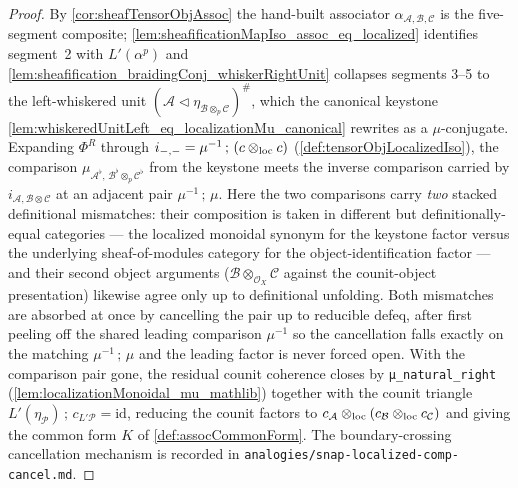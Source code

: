 \begin{proof}
  By \cref{cor:sheafTensorObjAssoc} the hand-built associator
  \(\alpha_{\mathcal{A},\mathcal{B},\mathcal{C}}\) is the five-segment composite;
  \cref{lem:sheafificationMapIso_assoc_eq_localized} identifies segment~2 with
  \(L'(\alpha^p)\) and
  \cref{lem:sheafification_braidingConj_whiskerRightUnit} collapses segments 3--5 to
  the left-whiskered unit \((\mathcal{A} \lhd \eta_{\mathcal{B}\otimes_p\mathcal{C}})^{\#}\),
  which the canonical keystone
  \cref{lem:whiskeredUnitLeft_eq_localizationMu_canonical} rewrites as a
  \(\mu\)-conjugate. Expanding \(\Phi^{R}\) through
  \(i_{-,-} = \mu^{-1}\,;\,(c \mathbin{\otimes_{\mathrm{loc}}} c)\) (\cref{def:tensorObjLocalizedIso}), the
  comparison \(\mu_{\mathcal{A}^{\flat},\,\mathcal{B}^{\flat}\otimes_p\mathcal{C}^{\flat}}\)
  from the keystone meets the inverse comparison carried by
  \(i_{\mathcal{A},\mathcal{B}\otimes\mathcal{C}}\) at an adjacent pair
  \(\mu^{-1}\,;\,\mu\). Here the two comparisons carry \emph{two} stacked
  definitional mismatches: their composition is taken in different but
  definitionally-equal categories --- the localized monoidal synonym for the
  keystone factor versus the underlying sheaf-of-modules category for the
  object-identification factor --- and their second object arguments
  (\(\mathcal{B}\otimes_{\mathcal{O}_X}\mathcal{C}\) against the counit-object
  presentation) likewise agree only up to definitional unfolding. Both mismatches
  are absorbed at once by cancelling the pair up to reducible defeq, after first
  peeling off the shared leading comparison \(\mu^{-1}\) so the cancellation falls
  exactly on the matching \(\mu^{-1}\,;\,\mu\) and the leading factor is never
  forced open. With the comparison pair gone, the residual counit coherence closes
  by \texttt{μ\_natural\_right} (\cref{lem:localizationMonoidal_mu_mathlib}) together
  with the counit triangle \(L'(\eta_{\mathcal{P}})\,;\,c_{L'\mathcal{P}} =
  \mathrm{id}\), reducing the counit factors to
  \(c_{\mathcal{A}} \mathbin{\otimes_{\mathrm{loc}}} (c_{\mathcal{B}} \mathbin{\otimes_{\mathrm{loc}}} c_{\mathcal{C}})\) and giving
  the common form \(K\) of \cref{def:assocCommonForm}. The boundary-crossing
  cancellation mechanism is recorded in
  \texttt{analogies/snap-localized-comp-cancel.md}.
\end{proof}

